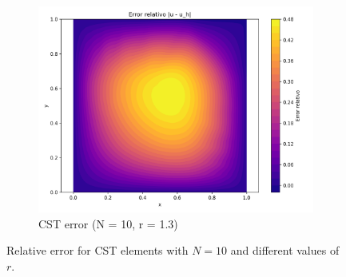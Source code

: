 \documentclass[12pt]{article}
\begin{document}
\begin{figure}[H]
    \hfill
    \begin{subfigure}[t]{0.32\textwidth}
        \centering
        \includegraphics[width=\textwidth]{Graficos/13/CST_relative_error_colormap.png}
        \caption{CST error (N = 10, r = 1.3)}
        \label{fig:cst_error_r1.3}
    \end{subfigure}
    \caption{Relative error for CST elements with $N = 10$ and different values of $r$.}
    \label{fig:cst_error_comparison}
\end{figure}
\end{document}
